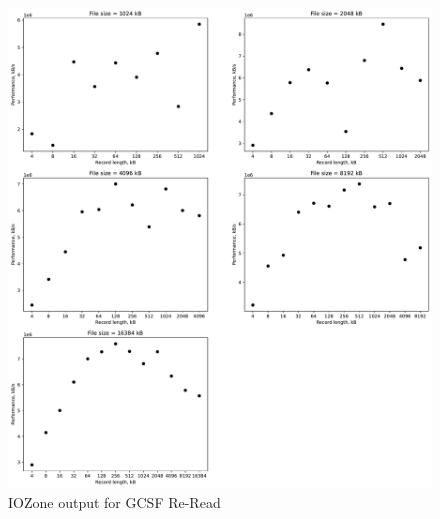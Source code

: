 \begin{figure}[!htb]
	\label{fig:app_bencgcsffs_re_read}
	\begin{center}
		\includegraphics[width=1.0\textwidth]{figures/benchmarking/gcsf/Re-Read.pdf}
	\end{center}
	\caption{IOZone output for GCSF Re-Read}
\end{figure}

